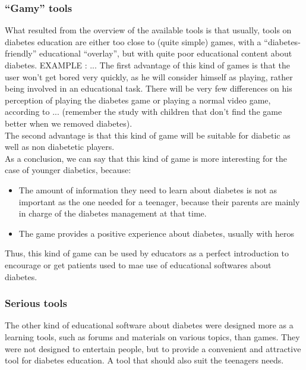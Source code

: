 \documentclass[12pt,MSc]{muthesis}
\begin{document}
\subsubsection{``Gamy'' tools}
What resulted from the overview of the available tools is that usually, tools on diabetes education are either too close to (quite simple) games, with a ``diabetes-friendly'' educational ``overlay'', but with quite poor educational content about diabetes. EXAMPLE : ...
The first advantage of this kind of games is that the user won't get bored very quickly, as he will consider himself as playing, rather being involved in an educational task. There will be very few differences on his perception of playing the diabetes game or playing a normal video game, according to ... (remember the study with children that don't find the game better when we removed diabetes).\\

The second advantage is that this kind of game will be suitable for diabetic as well as non diabetetic players.\\
As a conclusion, we can say that this kind of game is more interesting for the case of younger diabetics, because:
\begin{itemize}
\item The amount of information they need to learn about diabetes is not as important as the one needed for a teenager, because their parents are mainly in charge of the diabetes management at that time.
\item The game provides a positive experience about diabetes, usually with heros
\end{itemize}

Thus, this kind of game can be used by educators as a perfect introduction to encourage or get patients used to mae use of educational softwares about diabetes.

\subsubsection{Serious tools}
The other kind of educational software about diabetes were designed more as a learning tools, such as forums and materials on various topics, than games. They were not designed to entertain people, but to provide a convenient and attractive tool for diabetes education. A tool that should also suit the teenagers needs.\\
\end{document}
